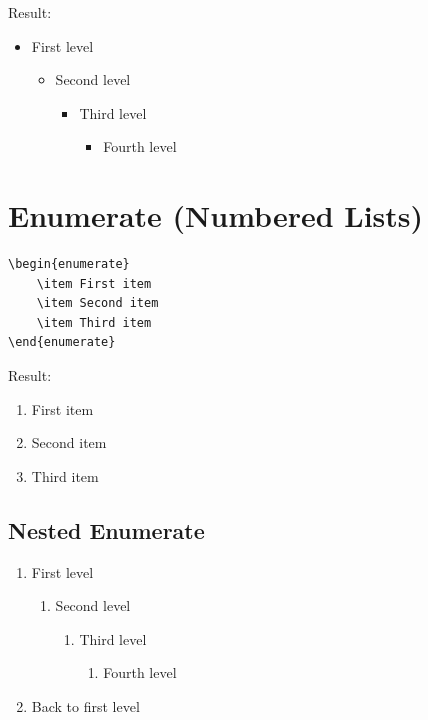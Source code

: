 Result:
\begin{itemize}
    \item First level
    \begin{itemize}
        \item Second level
        \begin{itemize}
            \item Third level
            \begin{itemize}
                \item Fourth level
            \end{itemize}
        \end{itemize}
    \end{itemize}
\end{itemize}

\section{Enumerate (Numbered Lists)}

\begin{lstlisting}[language={[LaTeX]TeX}, caption=Basic enumerate list]
\begin{enumerate}
    \item First item
    \item Second item
    \item Third item
\end{enumerate}
\end{lstlisting}

Result:
\begin{enumerate}
    \item First item
    \item Second item
    \item Third item
\end{enumerate}

\subsection{Nested Enumerate}

\begin{enumerate}
    \item First level
    \begin{enumerate}
        \item Second level
        \begin{enumerate}
            \item Third level
            \begin{enumerate}
                \item Fourth level
            \end{enumerate}
        \end{enumerate}
    \end{enumerate}
    \item Back to first level
\end{enumerate}

